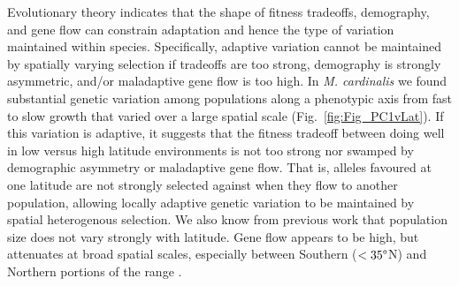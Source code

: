 \documentclass[11pt, oneside]{article}
\begin{document}
Evolutionary theory indicates that the shape of fitness tradeoffs, demography, and gene flow can constrain adaptation \citep{Levins_1968, Ronce_Kirkpatrick_2001} and hence the type of variation maintained within species. Specifically, adaptive variation cannot be maintained by spatially varying selection if tradeoffs are too strong, demography is strongly asymmetric, and/or maladaptive gene flow is too high. In \textit{M. cardinalis} we found substantial genetic variation among populations along a phenotypic axis from fast to slow growth that varied over a large spatial scale (Fig.~\ref{fig:Fig_PC1vLat}). If this variation is adaptive, it suggests that the fitness tradeoff between doing well in low versus high latitude environments is not too strong nor swamped by demographic asymmetry or maladaptive gene flow. That is, alleles favoured at one latitude are not strongly selected against when they flow to another population, allowing locally adaptive genetic variation to be maintained by spatial heterogenous selection. We also know from previous work that population size does not vary strongly with latitude. Gene flow appears to be high, but attenuates at broad spatial scales, especially between Southern ($<35\degree$N) and Northern portions of the range \citep{Paul_etal_2016}. 
\end{document}
